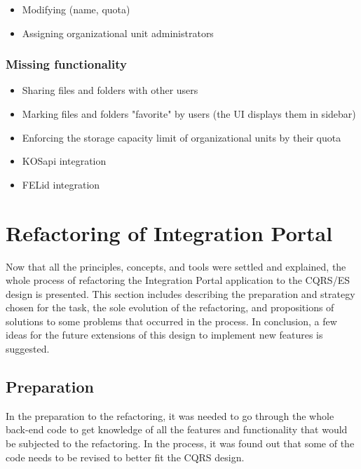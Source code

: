 \documentclass{book}
\begin{document}
\begin{itemize}
\tightlist
\item
  Modifying (name, quota)
\item
  Assigning organizational unit administrators
\end{itemize}

\subsubsection{Missing functionality}\label{missing-functionality}

\begin{itemize}
\tightlist
\item
  Sharing files and folders with other users
\item
  Marking files and folders "favorite" by users (the UI displays them in sidebar)
\item
  Enforcing the storage capacity limit of organizational units by their
  quota
\item
  KOSapi integration
\item
  FELid integration
\end{itemize}


\section{Refactoring of Integration
Portal}\label{refactoring-of-integration-portal}

Now that all the principles, concepts, and tools were settled and
explained, the whole process of refactoring the Integration Portal
application to the CQRS/ES design is presented. This section includes
describing the preparation and strategy chosen for the task, the sole
evolution of the refactoring, and propositions of solutions to some
problems that occurred in the process. In conclusion, a few ideas for
the future extensions of this design to implement new features is
suggested.

\subsection{Preparation}\label{preparation}

In the preparation to the refactoring, it was needed to go through the
whole back-end code to get knowledge of all the features and
functionality that would be subjected to the refactoring. In the
process, it was found out that some of the code needs to be revised to
better fit the CQRS design.
\end{document}
